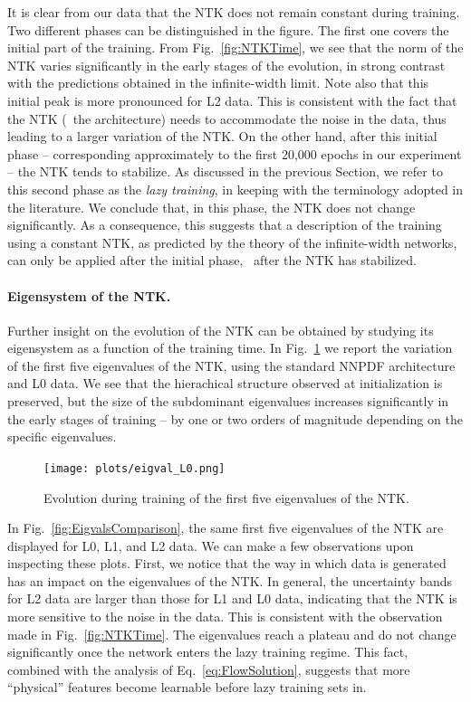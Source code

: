It is clear from our data that the NTK does not remain constant during training. 
Two different phases can be distinguished in the figure. The first one
covers the initial part of the training. From Fig.~\ref{fig:NTKTime}, we see
that the norm of the NTK varies significantly in the early stages of the evolution, in strong contrast with 
the predictions obtained in the infinite-width limit. Note also that this
initial peak is more pronounced for L2 data. This is consistent with the fact
that the NTK (\ie\ the architecture) needs to accommodate the noise in
the data, thus leading to a larger variation of the NTK. On the other hand,
after this initial phase -- corresponding approximately to the first 20,000 epochs in our experiment --
the NTK tends to stabilize. As discussed in the previous Section, we refer to this
second phase as the \textit{lazy training}, in keeping with the terminology
adopted in the literature. We conclude that, in this phase, the NTK does not
change significantly. As a consequence, this suggests that a description of 
the training using a constant NTK, as predicted by the theory of the
infinite-width networks, can only be applied after the initial
phase, \ie\ after the NTK has stabilized. 

\FloatBarrier

\paragraph{Eigensystem of the NTK.}
Further insight on the evolution of the NTK can be obtained by studying its eigensystem as 
a function of the training time. 
In Fig.~\ref{fig:EigvalL0Training} we report the variation of the first five eigenvalues 
of the NTK, using the standard NNPDF architecture and L0 data. We see that the hierachical
structure observed at initialization is preserved, but the size of the subdominant eigenvalues
increases significantly in the early stages of training -- by one or two orders of magnitude depending on the 
specific eigenvalues. 
\begin{figure}[ht!]
  \centering  
  \texttt{[image: plots/eigval\_L0.png]}  
  \caption{Evolution during training of the first five eigenvalues of the NTK.}
  \label{fig:EigvalL0Training}
\end{figure}
In Fig.~\ref{fig:EigvalsComparison}, the same first five eigenvalues of the NTK
are displayed for L0, L1, and L2 data. We can make a few observations upon
inspecting these plots. First, we notice that the way in which data is generated
has an impact on the eigenvalues of the NTK. In general, the uncertainty bands
for L2 data are larger than those for L1 and L0 data, indicating that the NTK is
more sensitive to the noise in the data. This is consistent with the observation
made in Fig.~\ref{fig:NTKTime}. 
The eigenvalues reach a plateau and do not change significantly once 
the network enters the lazy training regime. This fact, combined with the analysis of Eq.~\eqref{eq:FlowSolution}, 
suggests that more ``physical'' features become learnable before lazy training sets in. 

